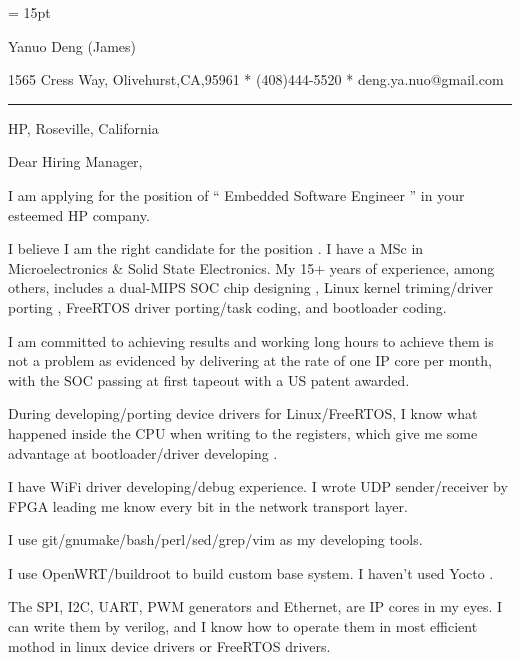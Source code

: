 

  \FFrg \baselineskip = 15pt

{
Yanuo Deng (James)
}

{ 
1565 Cress Way, Olivehurst,CA,95961
*
(408)444-5520
*
deng.ya.nuo@gmail.com
}

{ \smallbreak } 

{\par\noindent\hrule} 

{ \bigbreak } 



HP, Roseville, California

{ \bigbreak } 
{ 
Dear Hiring Manager,
}

{ \bigbreak } 
I am applying for the position of `` Embedded Software Engineer '' in your esteemed HP company.

{ \bigbreak } 
I believe I am the right candidate for the position .
I have a MSc in Microelectronics \& Solid State Electronics.
My 15+ years of experience, among others, 
includes a dual-MIPS SOC chip designing ,
Linux kernel triming/driver porting , 
FreeRTOS driver porting/task coding,
and bootloader coding.

{ \bigbreak } 
I am committed to achieving results and working long hours 
to achieve them is not a problem as evidenced by 
delivering at the rate of one IP core per month,
with the SOC passing at first tapeout
with a US patent awarded.

{ \bigbreak } 
During developing/porting device drivers for Linux/FreeRTOS,
I know what happened inside the CPU when writing to the registers,
which give me some advantage at bootloader/driver developing .

{ \bigbreak } 
I have WiFi driver developing/debug experience. 
I wrote UDP sender/receiver by FPGA leading me know every bit in the network transport layer.

{ \bigbreak } 
I use git/gnumake/bash/perl/sed/grep/vim as my developing tools.

{ \bigbreak } 
I use OpenWRT/buildroot to build custom base system. I haven't used Yocto .

{ \bigbreak } 
The SPI, I2C, UART, PWM generators and Ethernet, are IP cores in my eyes.
I can write them by verilog, 
and I know how to operate them in most efficient mothod
in linux device drivers or FreeRTOS drivers.

